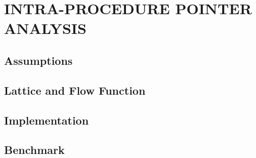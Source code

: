\section{INTRA-PROCEDURE POINTER ANALYSIS}

\subsection{Assumptions}


\subsection{Lattice and Flow Function}


\subsection{Implementation}


\subsection{Benchmark}
